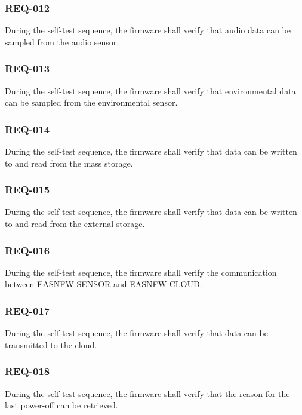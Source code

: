 \documentclass[11pt,a4paper]{article}
\begin{document}
\subsubsection{REQ-012}

During the self-test sequence, the firmware shall verify that audio data can be
sampled from the audio sensor.

\subsubsection{REQ-013}

During the self-test sequence, the firmware shall verify that environmental data
can be sampled from the environmental sensor.

\subsubsection{REQ-014}

During the self-test sequence, the firmware shall verify that data can be
written to and read from the mass storage.

\subsubsection{REQ-015}

During the self-test sequence, the firmware shall verify that data can be
written to and read from the external storage.

\subsubsection{REQ-016}

During the self-test sequence, the firmware shall verify the communication
between EASNFW-SENSOR and EASNFW-CLOUD.

\subsubsection{REQ-017}

During the self-test sequence, the firmware shall verify that data can be
transmitted to the cloud.

\subsubsection{REQ-018}

During the self-test sequence, the firmware shall verify that the reason for the
last power-off can be retrieved.
\end{document}
